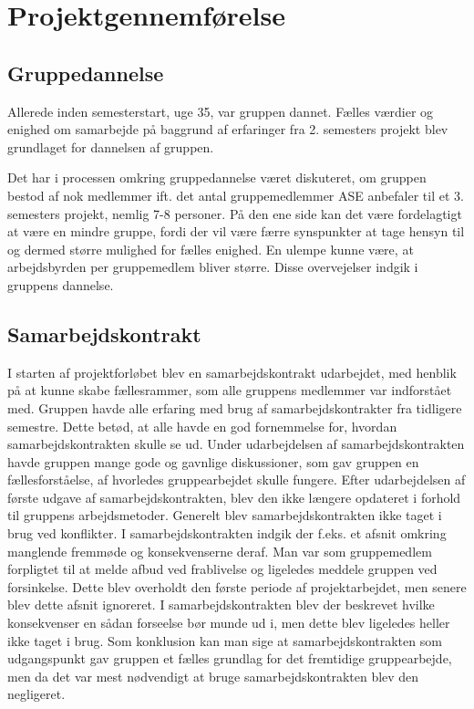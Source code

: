 \chapter{Projektgennemførelse}
\section{Gruppedannelse}
Allerede inden semesterstart, uge 35, var gruppen dannet. Fælles værdier og enighed om samarbejde på baggrund af erfaringer fra 2. semesters projekt blev grundlaget for dannelsen af gruppen.

Det har i processen omkring gruppedannelse været diskuteret, om gruppen bestod af nok medlemmer ift. det antal gruppemedlemmer ASE anbefaler til et 3. semesters projekt, nemlig 7-8 personer. På den ene side kan det være fordelagtigt at være en mindre gruppe, fordi der vil være færre synspunkter at tage hensyn til og dermed større mulighed for fælles enighed. En ulempe kunne være, at arbejdsbyrden per gruppemedlem bliver større. Disse overvejelser indgik i gruppens dannelse.\\

\section{Samarbejdskontrakt}
I starten af projektforløbet blev en samarbejdskontrakt udarbejdet, med henblik på at kunne skabe fællesrammer, som alle gruppens medlemmer var indforstået med. Gruppen havde alle erfaring med brug af samarbejdskontrakter fra tidligere semestre. Dette betød, at alle havde en god fornemmelse for, hvordan samarbejdskontrakten skulle se ud. Under udarbejdelsen af samarbejdskontrakten havde gruppen mange gode og gavnlige diskussioner, som gav gruppen en fællesforståelse, af hvorledes gruppearbejdet skulle fungere. Efter udarbejdelsen af første udgave af samarbejdskontrakten, blev den ikke længere opdateret i forhold til gruppens arbejdsmetoder. Generelt blev samarbejdskontrakten ikke taget i brug ved konflikter. I samarbejdskontrakten indgik der f.eks. et afsnit omkring manglende fremmøde og konsekvenserne deraf. Man var som gruppemedlem forpligtet til at melde afbud ved frablivelse og ligeledes meddele gruppen ved forsinkelse. Dette blev overholdt den første periode af projektarbejdet, men senere blev dette afsnit ignoreret. I samarbejdskontrakten blev der beskrevet hvilke konsekvenser en sådan forseelse bør munde ud i, men dette blev ligeledes heller ikke taget i brug. Som konklusion kan man sige at samarbejdskontrakten som udgangspunkt gav gruppen et fælles grundlag for det fremtidige gruppearbejde, men da det var mest nødvendigt at bruge samarbejdskontrakten blev den negligeret.
 
